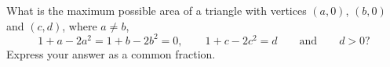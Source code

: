 What is the maximum possible area of a triangle with vertices $(a,0)$, $(b,0)$ and $(c,d)$, where $a\ne b$,
\[1+a-2a^2=1+b-2b^2=0,\qquad 1+c-2c^2=d\qquad\text{and}\qquad d>0?\]
Express your answer as a common fraction.
